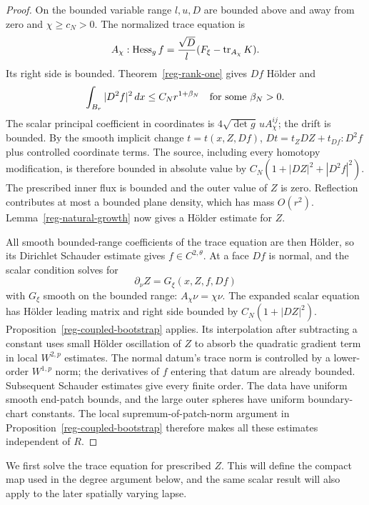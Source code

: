 \begin{proof}
On the bounded variable range $l,u,D$ are bounded above and away
from zero and $\chi\ge c_N>0$.  The normalized trace equation is
\[
 A_\chi:\operatorname{Hess}_g f=\frac{\sqrt D}{l}
                                      (F_\xi-\operatorname{tr}_{A_\chi}K).
\]
Its right side is bounded.  Theorem~\ref{reg-rank-one} gives
$Df$ H\"older and
\[
 \int_{B_r}|D^2f|^2\,dx\le C_Nr^{1+\beta_N}
 \quad\hbox{for some }\beta_N>0.
\]
The scalar principal coefficient in coordinates is
$4\sqrt{\det g}\,u A_\chi^{ij}$; the drift is bounded.
By the smooth implicit change $t=t(x,Z,Df)$,
$Dt=t_ZDZ+t_{Df}:D^2f$ plus controlled coordinate terms.
The source, including every homotopy modification, is therefore
bounded in absolute value by
$C_N(1+|DZ|^2+|D^2f|^2)$.
The prescribed inner flux is bounded and the outer value of $Z$
is zero.  Reflection contributes at most a bounded plane density,
which has mass $O(r^2)$.  Lemma~\ref{reg-natural-growth} now
gives a H\"older estimate for $Z$.

All smooth bounded-range coefficients of the trace equation are
then H\"older, so its Dirichlet Schauder estimate gives
$f\in C^{2,\theta}$.  At a face $Df$ is normal, and the scalar
condition solves for
\[
 \partial_\nu Z=G_\xi(x,Z,f,Df)
\]
with $G_\xi$ smooth on the bounded range: $A_\chi\nu=\chi\nu$.
The expanded scalar equation has H\"older leading matrix and
right side bounded by $C_N(1+|DZ|^2)$.
Proposition~\ref{reg-coupled-bootstrap} applies.  Its interpolation
after subtracting a constant uses small H\"older oscillation of
$Z$ to absorb the quadratic gradient term in local $W^{2,p}$
estimates.  The normal datum's trace norm is controlled by a
lower-order $W^{1,p}$ norm; the derivatives of $f$ entering that
datum are already bounded.  Subsequent Schauder estimates give
every finite order.  The data have uniform smooth end-patch
bounds, and the large outer spheres have uniform boundary-chart
constants.  The local supremum-of-patch-norm argument in
Proposition~\ref{reg-coupled-bootstrap} therefore makes all these
estimates independent of $R$.
\end{proof}

We first solve the trace equation for prescribed $Z$. This will define
the compact map used in the degree argument below, and the same scalar
result will also apply to the later spatially varying lapse.

